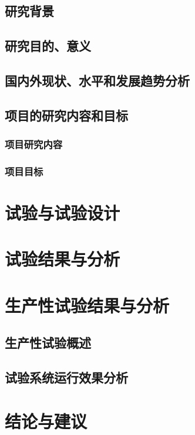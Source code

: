 {}
\subsection{研究背景}
\setlength{\parindent}{2em}

\subsection{研究目的、意义}

\subsection{国内外现状、水平和发展趋势分析}

\subsection{项目的研究内容和目标}
\subsubsection{项目研究内容}

\subsubsection{项目目标}

{\centering\section{试验与试验设计}}
\setlength{\parindent}{2em}

{\centering\section{试验结果与分析}}
\setlength{\parindent}{2em}

{\centering\section{生产性试验结果与分析}}
\subsection{生产性试验概述}
\setlength{\parindent}{2em}

\subsection{试验系统运行效果分析}
\setlength{\parindent}{2em}

{\centering\section{结论与建议}}
\setlength{\parindent}{2em}

